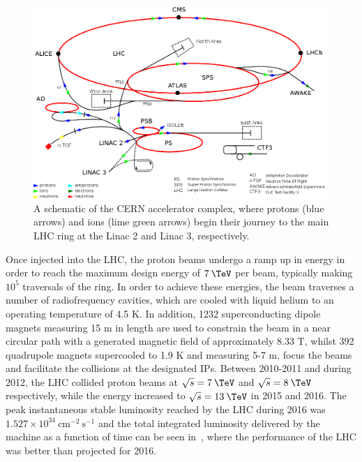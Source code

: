 \begin{figure}
  \centering
  \includegraphics[width=\textwidth]{figs/accelerator.png}
  \caption{A schematic of the CERN accelerator complex, where protons (blue arrows) and ions (lime green arrows) begin their journey to the main LHC ring at the Linac 2 and Linac 3, respectively.}
  \label{fig:accelerator}
\end{figure}

Once injected into the LHC, the proton beams undergo a ramp up in energy in order to reach the maximum design energy of $7\:\TeV$ per beam, typically making $10^5$ traversals of the ring. In order to achieve these energies, the beam traverses a number of radiofrequency cavities, which are cooled with liquid helium to an operating temperature of 4.5 K. In addition, 1232 superconducting dipole magnets measuring 15 m in length are used to constrain the beam in a near circular path with a generated magnetic field of approximately 8.33 T, whilst 392 quadrupole magnets supercooled to 1.9 K and measuring 5-7 m, focus the beams and facilitate the collisions at the designated IPs. Between 2010-2011 and during 2012, the LHC collided proton beams at $\sqrt{s}=7\:\TeV$ and $\sqrt{s}=8\:\TeV$ respectively, while the energy increased to $\sqrt{s}=13\:\TeV$ in 2015 and 2016. The peak instantaneous stable luminosity reached by the LHC during 2016 was $1.527\times 10^34\:\text{cm}^{-2}\:\text{s}^{-1}$ and the total integrated luminosity delivered by the machine as a function of time can be seen in~, where the performance of the LHC was better than projected for 2016.

